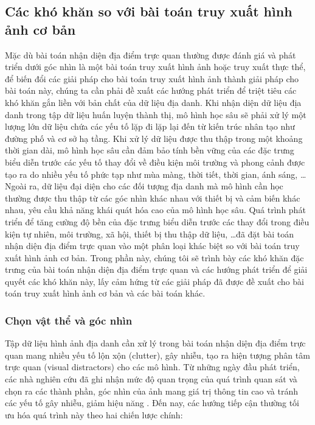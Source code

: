 \subsection{Các khó khăn so với bài toán truy xuất hình ảnh cơ bản}

Mặc dù bài toán nhận diện địa điểm trực quan thường được đánh giá và phát triển dưới góc nhìn là một bài toán truy xuất hình ảnh hoặc truy xuất thực thể, để biến đổi các giải pháp cho bài toán truy xuất hình ảnh thành giải pháp cho bài toán này, chúng ta cần phải đề xuất các hướng phát triển để triệt tiêu các khó khăn gắn liền với bản chất của dữ liệu địa danh. Khi nhận diện dữ liệu địa danh trong tập dữ liệu huấn luyện thành thị, mô hình học sâu sẽ phải xử lý một lượng lớn dữ liệu chứa các yếu tố lặp đi lặp lại đến từ kiến trúc nhân tạo như đường phố và cơ sở hạ tầng. Khi xử lý dữ liệu được thu thập trong một khoảng thời gian dài, mô hình học sâu cần đảm bảo tính bền vững của các đặc trưng biểu diễn trước các yếu tố thay đổi về điều kiện môi trường và phong cảnh được tạo ra do nhiều yếu tố phức tạp như mùa màng, thời tiết, thời gian, ánh sáng, \dots Ngoài ra, dữ liệu đại diện cho các đối tượng địa danh mà mô hình cần học thường được thu thập từ các góc nhìn khác nhau với thiết bị và cảm biến khác nhau, yêu cầu khả năng khái quát hóa cao của mô hình học sâu. Quá trình phát triển để tăng cường độ bền của đặc trưng biểu diễn trước các thay đổi trong điều kiện tự nhiên, môi trường, xã hội, thiết bị thu thập dữ liệu, \dots đã đặt bài toán nhận diện địa điểm trực quan vào một phân loại khác biệt so với bài toán truy xuất hình ảnh cơ bản. Trong phần này, chúng tôi sẽ trình bày các khó khăn đặc trưng của bài toán nhận diện địa điểm trực quan và các hướng phát triển để giải quyết các khó khăn này, lấy cảm hứng từ các giải pháp đã được đề xuất cho bài toán truy xuất hình ảnh cơ bản và các bài toán khác.

\subsubsection{Chọn vật thể và góc nhìn}

Tập dữ liệu hình ảnh địa danh cần xử lý trong bài toán nhận diện địa điểm trực quan mang nhiều yếu tố lộn xộn (clutter), gây nhiễu, tạo ra hiện tượng phân tâm trực quan (visual distractors) cho các mô hình. Từ những ngày đầu phát triển, các nhà nghiên cứu đã ghi nhận mức độ quan trọng của quá trình quan sát và chọn ra các thành phần, góc nhìn của ảnh mang giá trị thông tin cao và tránh các yếu tố gây nhiễu, giảm hiệu năng \cite{4270175, knopp2010avoiding, predicting-good-features, Torii2013VisualPR, arandjelovic2015dislocation}. Đến nay, các hướng tiếp cận thường tối ưu hóa quá trình này theo hai chiến lược chính:

